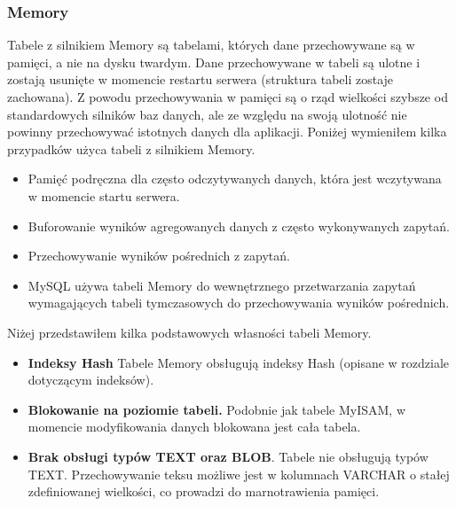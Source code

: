 \subsubsection{Memory}
Tabele z silnikiem Memory są tabelami, których dane przechowywane są w pamięci, a nie na dysku twardym. Dane przechowywane w tabeli są ulotne i zostają usunięte w momencie restartu serwera (struktura tabeli zostaje zachowana). Z powodu przechowywania w pamięci są o rząd wielkości szybsze od standardowych silników baz danych, ale ze względu na swoją ulotność nie powinny przechowywać istotnych danych dla aplikacji. Poniżej wymieniłem kilka przypadków użyca tabeli z silnikiem Memory. 
\begin{itemize}
	\item Pamięć podręczna dla często odczytywanych danych, która jest wczytywana w momencie startu serwera.
	\item Buforowanie wyników agregowanych danych z często wykonywanych zapytań.
	\item Przechowywanie wyników pośrednich z zapytań.
	\item MySQL używa tabeli Memory do wewnętrznego przetwarzania zapytań wymagających tabeli tymczasowych do przechowywania wyników pośrednich.
\end{itemize}
Niżej przedstawiłem kilka podstawowych własności tabeli Memory.
\begin{itemize}
	\item \textbf{Indeksy Hash} Tabele Memory obsługują indeksy Hash (opisane w rozdziale dotyczącym indeksów).
	\item \textbf{Blokowanie na poziomie tabeli.} Podobnie jak tabele MyISAM, w momencie modyfikowania danych blokowana jest cała tabela.
	\item \textbf{Brak obsługi typów TEXT oraz BLOB}. Tabele nie obsługują typów TEXT. Przechowywanie teksu możliwe jest w kolumnach VARCHAR o stałej zdefiniowanej wielkości, co prowadzi do marnotrawienia pamięci.
\end{itemize}
